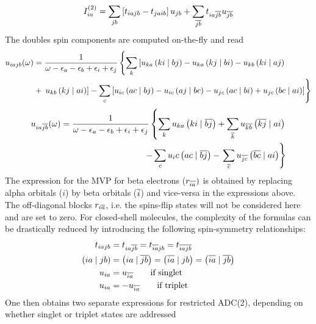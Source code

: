 \begin{equation}
I_{ia}^{(2)} = \sum_{jb} \left[ t_{iajb} - t_{jaib} \right] u_{jb} + \sum_{\overline{jb}} t_{ia\overline{jb}} u_{\overline{jb}}
\end{equation}
\noindent The doubles spin components are computed on-the-fly and read
\begin{equation}
\begin{split}
u_{iajb}(\omega) &= \frac{1}{\omega - \epsilon_a - \epsilon_b + \epsilon_i + \epsilon_j} \left\lbrace \sum_k \left[ u_{ka} \left( ki \mid bj \right) - u_{ka} \left( kj \mid bi \right) - u_{kb} \left( ki \mid aj \right) \right. \right. \\
&+ \left. \left. u_{kb} \left( kj \mid ai \right) \right] - \sum_c \left[ u_{ic} \left( ac \mid bj \right) - u_{ic} \left( aj \mid bc \right) - u_{jc} \left( ac \mid bi \right) + u_{jc} \left( bc \mid ai \right) \right] \right\rbrace
\end{split}
\end{equation}
\begin{equation}
\begin{split}
u_{ia\overline{jb}}(\omega) = \frac{1}{\omega - \epsilon_a - \epsilon_b + \epsilon_i + \epsilon_j} \left\lbrace \sum_k u_{ka} \left( ki \mid \overline{bj} \right) + \sum_{\overline{k}} u_{\overline{kb}} \left( \overline{kj} \mid ai \right) \right. \\ - \sum_c u_ic \left( ac \mid \overline{bj} \right) - \left. \sum_{\overline{c}} u_{\overline{jc}} \left( \overline{bc} \mid ai \right) \right\rbrace
\end{split}
\end{equation}
\noindent The expression for the MVP for beta electrons ($r_{\overline{ia}})$ is obtained by replacing alpha orbitals ($i$) by beta orbitals ($\overline{i}$) and vice-versa in the expressions above. The off-diagonal blocks $r_{i\overline{a}}$, i.e. the spins-flip states will not be considered here and are set to zero. For closed-shell molecules, the complexity of the formulas can be drastically reduced by introducing the following spin-symmetry relationships:
\begin{align}
t_{iajb} &= t_{ia\overline{jb}} = t_{\overline{ia}jb} = t_{\overline{iajb}}   \label{eq:SPIN1}\\
\left( ia \mid jb \right) &= \left( ia \mid \overline{jb} \right) = \left( \overline{ia} \mid jb \right) = \left( \overline{ia} \mid \overline{jb} \right) \label{eq:SPIN2} \\
u_{ia} &= u_{\overline{ia}} \qquad \textrm{if singlet} \label{eq:SPIN3} \\
u_{ia} &= - u_{\overline{ia}} \qquad \textrm{if triplet} \label{eq:SPIN4}
\end{align}
\noindent One then obtains two separate expressions for restricted ADC(2), depending on whether singlet or triplet states are addressed
